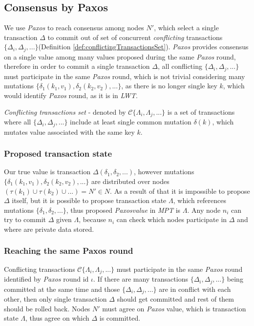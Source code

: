 \documentclass[runningheads,a4paper]{llncs}
\newcommand{\nodesTx}{$\mathit{N'}$\xspace}
\newcommand{\transaction}{$\Delta$\xspace}
\newcommand{\transactions}{$\{\Delta_{i}, \Delta_{j}, ...\}$\xspace}
\newcommand{\txStates}{$\{\Lambda_{i}, \Lambda_{j}, ...\}$\xspace}
\newcommand{\conflictingTxSet}{$\mathcal{C}\text{\txStates}$\xspace}
\newcommand{\nodesOfMutations}{$(\tau(k_1) \cup \tau(k_2) \cup ... ) =  \text{\nodesTx}\in\mathit{N}$\xspace}
\newcommand{\mutations}{$\{\delta_{1}, \delta_{2}, ...\}$\xspace}
\newcommand{\paxosRoundId}{$\iota$\xspace}
\newcommand{\mutationsFull}{$\{\delta_{1}(k_1, v_1), \delta_{2}(k_2, v_2), ...\}$\xspace}
\newcommand{\transactionFull}{$\Delta(\delta_{1}, \delta_{2}, ...)$\xspace}
\newcommand{\txState}{$\Lambda$\xspace}
\newcommand{\paxos}{\emph{Paxos}\xspace}
\newcommand{\mpt}{\emph{MPT}\xspace}
\newcommand{\lwt}{\emph{LWT}\xspace}
\newcommand{\node}[1]{$n_{#1}$\xspace}
\begin{document}
\subsection{Consensus by Paxos}
We use \paxos to reach consensus among nodes \nodesTx, which select a single transaction \transaction to commit out of set of concurrent \emph{conflicting} transactions \transactions (Definition \ref{def:conflictingTransactionsSet}). \paxos provides consensus on a single value among many values proposed during the same \paxos round, therefore in order to commit a single transaction \transaction, all conflicting \transactions must participate in the same \paxos round, which is not trivial considering many mutations \mutationsFull, as there is no longer single key $k$, which would identify \paxos round, as it is in \lwt.

\begin{definition}
\label{def:conflictingTransactionsSet}
\emph{Conflicting transactions set} - denoted by \conflictingTxSet is a set of transactions where all \transactions include at least single common mutation $\delta(k)$, which mutates value associated with the same key $k$.
\end{definition}

\subsubsection{Proposed transaction state}
Our true value is transaction \transactionFull, however mutations \mutationsFull are distributed over nodes
\nodesOfMutations. As a result of that it is impossible to propose \transaction itself, but it is possible to propose transaction
state \txState, which references mutations \mutations, thus proposed \paxos \emph{value} in \mpt is \txState. Any
node \node{i} can try to commit \transaction given \txState, because \node{i} can check which nodes participate in \transaction and where are private data stored.


\subsubsection{Reaching the same Paxos round}
Conflicting transactions \conflictingTxSet must participate in the same \paxos round identified by \paxos round id \paxosRoundId.
If there are many transactions \transactions being committed at the same time and those \transactions are in conflict
with each other, then only single transaction \transaction should get committed and rest of them should be rolled back. Nodes \nodesTx must agree on \paxos value, which is transaction state \txState, thus agree on which \transaction is committed.
\end{document}
